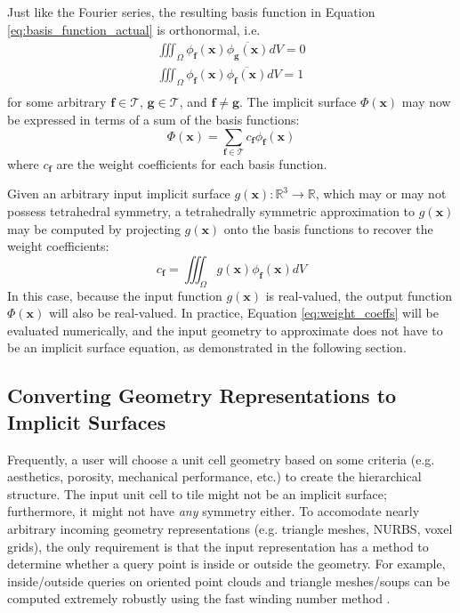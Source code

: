 \documentclass[acmtog]{acmart}
\begin{document}
Just like the Fourier series, the resulting basis function in Equation \ref{eq:basis_function_actual} is orthonormal, i.e.
%
\begin{equation}
  \begin{split}
    \iiint_{\Omega} \phi_{\mathbf{f}}(\mathbf{x}) \overline{\phi_{\mathbf{g}}(\mathbf{x})} dV = 0 \\
    \iiint_{\Omega} \phi_{\mathbf{f}}(\mathbf{x}) \overline{\phi_{\mathbf{f}}(\mathbf{x})} dV = 1 \\
  \end{split}
\end{equation}
%
for some arbitrary $\mathbf{f} \in \mathcal{T}$, $\mathbf{g} \in \mathcal{T}$, and $\mathbf{f} \neq \mathbf{g}$. The implicit surface $\Phi(\mathbf{x})$ may now be expressed in terms of a sum of the basis functions:
%
\begin{equation}
  \label{eq:symmetric_implicit_surface}
  \Phi(\mathbf{x}) = \sum\limits_{\mathbf{f} \in \mathcal{T}} c_{\mathbf{f}} \phi_{\mathbf{f}}(\mathbf{x})
\end{equation}
%
where $c_{\mathbf{f}}$ are the weight coefficients for each basis function.

Given an arbitrary input implicit surface $g(\mathbf{x}): \mathbb{R}^3 \rightarrow \mathbb{R}$, which may or may not possess tetrahedral symmetry, a tetrahedrally symmetric approximation to $g(\mathbf{x})$ may be computed by projecting $g(\mathbf{x})$ onto the basis functions to recover the weight coefficients:
%
\begin{equation}
  \label{eq:weight_coeffs}
  c_{\mathbf{f}} = \iiint_{\Omega} g(\mathbf{x}) \phi_{\mathbf{f}}(\mathbf{x}) dV
\end{equation}
%
In this case, because the input function $g(\mathbf{x})$ is real-valued, the output function $\Phi(\mathbf{x})$ will also be real-valued. In practice, Equation \ref{eq:weight_coeffs} will be evaluated numerically, and the input geometry to approximate does not have to be an implicit surface equation, as demonstrated in the following section.

\subsection{Converting Geometry Representations to Implicit Surfaces}

Frequently, a user will choose a unit cell geometry based on some criteria (e.g. aesthetics, porosity, mechanical performance, etc.) to create the hierarchical structure. The input unit cell to tile might not be an implicit surface; furthermore, it might not have \textit{any} symmetry either. To accomodate nearly arbitrary incoming geometry representations (e.g. triangle meshes, NURBS, voxel grids), the only requirement is that the input representation has a method to determine whether a query point is inside or outside the geometry. For example, inside/outside queries on oriented point clouds and triangle meshes/soups can be computed extremely robustly using the fast winding number method \cite{barill2018fast}.
\end{document}
